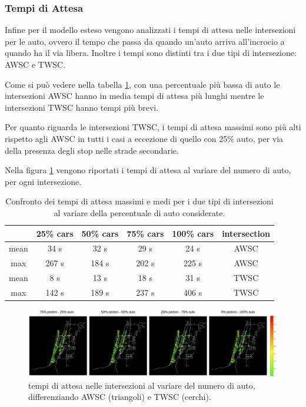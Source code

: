 \subsubsection*{Tempi di Attesa}

Infine per il modello esteso vengono analizzati i tempi di attesa nelle intersezioni per le auto,
ovvero il tempo che passa da quando un'auto arriva all'incrocio a quando ha il via libera. 
Inoltre i tempi sono distinti tra i due tipi di intersezione: AWSC e TWSC.

Come si può vedere nella tabella \ref{tab:analisi-car-delay}, con una percentuale più bassa di auto le intersezioni AWSC 
hanno in media tempi di attesa più lunghi mentre le intersezioni TWSC hanno tempi più brevi.

Per quanto riguarda le intersezioni TWSC, i tempi di attesa massimi sono più alti rispetto agli AWSC in tutti i casi a eccezione di quello con 25\% auto, 
per via della presenza degli stop nelle strade secondarie.

Nella figura \ref{fig:analisi-comparison-car-delay} vengono riportati i tempi di attesa al variare del numero di auto,
per ogni intersezione.



\begin{table}[ht]
    \centering
    \begin{tabular}{|c|c|c|c|c|c|}
    \hline
         & 25\% cars & 50\% cars & 75\% cars & 100\% cars & intersection \\ \hline
    mean & 34 s  & 32 s  & 29 s  & 24 s  & AWSC         \\ \hline
    max  & 267 s & 184 s & 202 s & 225 s & AWSC         \\ \hline
    mean & 8 s   & 13 s  & 18 s  & 31 s  & TWSC         \\ \hline
    max  & 142 s & 189 s & 237 s & 406 s & TWSC         \\ \hline
    \end{tabular}
    \caption{Confronto dei tempi di attesa massimi e medi per i due tipi di intersezioni al variare della percentuale di auto considerate.}
    \label{tab:analisi-car-delay}
\end{table}



\begin{figure}[ht]
    \includegraphics[width=1\textwidth]{images/analisi/comparison-car-delay.png}   
    \caption{tempi di attesa nelle intersezioni al variare del numero di auto, differenziando AWSC (triangoli) e TWSC (cerchi).}
    \label{fig:analisi-comparison-car-delay}
\end{figure}

